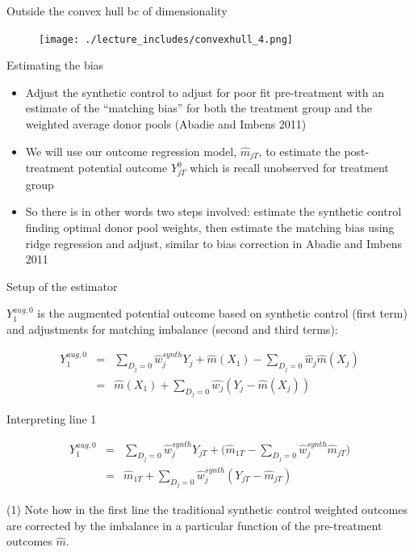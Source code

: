 \documentclass{beamer}
\begin{document}
\begin{frame}{Outside the convex hull bc of dimensionality}

	\begin{figure}
	\texttt{[image: ./lecture\_includes/convexhull\_4.png]}
	\end{figure}

\end{frame}


\begin{frame}{Estimating the bias}

\begin{itemize}
\item Adjust the synthetic control to adjust for poor fit pre-treatment with an estimate of the ``matching bias'' for both the treatment group and the weighted average donor pools (Abadie and Imbens 2011)
\item We will use our outcome regression model, $\widehat{m}_{jT}$, to estimate the post-treatment potential outcome $Y_{jT}^0$ which is recall unobserved for treatment group
\item So there is in other words two steps involved: estimate the synthetic control finding optimal donor pool weights, then estimate the matching bias using ridge regression and adjust, similar to bias correction in Abadie and Imbens 2011
\end{itemize}


\end{frame}




\begin{frame}{Setup of the estimator}

$Y_1^{aug,0}$ is the augmented potential outcome based on synthetic control (first term) and adjustments for matching imbalance (second and third terms):

\begin{eqnarray*}
Y_1^{aug,0} &=& \sum_{D_j=0} \widehat{w}_j^{synth} Y_{j} + \widehat{m}(X_1) - \sum_{D_j=0} \widehat{w}_j \widehat{m}(X_j) \\
&=& \widehat{m}(X_1) + \sum_{D_j=0} \widehat{w_j}(Y_j - \widehat{m}(X_j))
\end{eqnarray*}

\end{frame}


\begin{frame}{Interpreting line 1}

\begin{eqnarray*}
Y_1^{aug,0} &=& \sum_{D_j=0} \widehat{w}_j^{synth} Y_{jT} + \bigg (\widehat{m}_{1T} - \sum_{D_j=0} \widehat{w}_j^{synth}\widehat{m}_{jT} \bigg ) \\
&=& \widehat{m}_{1T} + \sum_{D_j=0} \widehat{w}_j^{synth} (Y_{jT} - \widehat{m}_{jT})
\end{eqnarray*}

(1) Note how in the first line the traditional synthetic control weighted outcomes are corrected by the imbalance in a particular function of the pre-treatment outcomes $\widehat{m}$. 
\end{frame}
\end{document}
